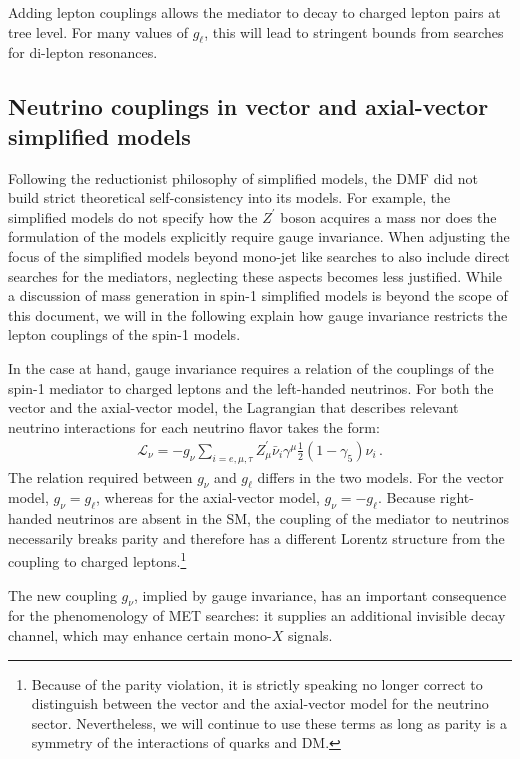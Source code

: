 \documentclass[review]{elsarticle}
\begin{document}
Adding lepton couplings allows the mediator to decay to charged lepton pairs at tree level. For many values of $g_\ell$, this will lead to stringent bounds from searches for di-lepton resonances.

\subsection{Neutrino couplings in vector and axial-vector simplified models}

Following the reductionist philosophy of simplified models, the DMF did not build strict theoretical self-consistency into its models. For example, the simplified models do not specify how the $Z^\prime$ boson acquires a mass nor does the formulation of the models explicitly require gauge invariance. When adjusting the focus of the simplified models beyond mono-jet like searches to also include direct searches for the mediators, neglecting these aspects becomes less justified. While a discussion of mass generation in spin-1 simplified models is beyond the scope of this document, we will in the following explain how gauge invariance restricts the lepton couplings of the spin-1 models.

In the case at hand, gauge invariance requires a relation of the couplings of the spin-1 mediator to charged leptons and the  left-handed neutrinos. For both the vector and the axial-vector model, the Lagrangian that describes relevant neutrino interactions for each neutrino flavor takes the form:
\begin{align}
\label{eq:neu}
\mathcal{L}_\nu = - g_\nu \sum_{i=e,\mu,\tau} Z^\prime_\mu \bar \nu_i \gamma^\mu \frac{1}{2}(1-\gamma_5) \nu_i \, .
\end{align}
The relation required between $g_\nu$ and $g_\ell$ differs in the two models. For the vector model, $g_\nu = g_\ell$, whereas for the axial-vector model, $g_\nu = - g_\ell$. Because right-handed neutrinos are absent in the SM, the coupling of the mediator to neutrinos necessarily breaks parity and therefore has a different Lorentz structure from the coupling to charged leptons.\footnote{Because of the parity violation, it is strictly speaking no longer correct to distinguish between the vector and the axial-vector model for the neutrino sector. Nevertheless, we will continue to use these terms as long as parity is a symmetry of the interactions of quarks and DM.}

The new coupling $g_\nu$, implied by gauge invariance, has an important consequence for the phenomenology of MET searches: it supplies an additional invisible decay channel, which may enhance certain mono-$X$ signals. 
\end{document}
